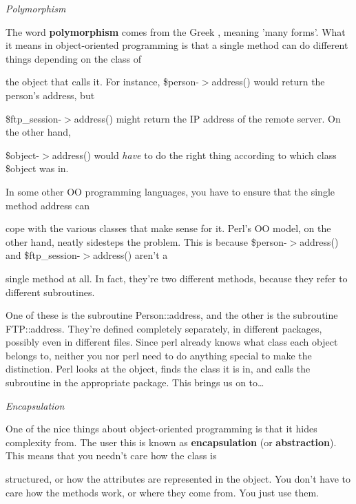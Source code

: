 \documentclass[a4paper,11pt]{book}
\begin{document}
\noindent 

\noindent \textit{Polymorphism}

\noindent The word \textbf{polymorphism }comes from the Greek  , meaning 'many forms'. What it means in object-oriented programming is that a single method can do different things depending on the class of

\noindent the object that calls it. For instance, \$person-$>$address() would return the person's address, but

\noindent \$ftp\_session-$>$address() might return the IP address of the remote server. On the other hand,

\noindent \$object-$>$address() would \textit{have }to do the right thing according to which class \$object was in.

\noindent 

\noindent In some other OO programming languages, you have to ensure that the single method address can

\noindent cope with the various classes that make sense for it. Perl's OO model, on the other hand, neatly sidesteps the problem. This is because \$person-$>$address() and \$ftp\_session-$>$address() aren't a

\noindent single method at all. In fact, they're two different methods, because they refer to different subroutines.

\noindent 

\noindent One of these is the subroutine Person::address, and the other is the subroutine FTP::address. They're defined completely separately, in different packages, possibly even in different files. Since perl already knows what class each object belongs to, neither you nor perl need to do anything special to make the distinction. Perl looks at the object, finds the class it is in, and calls the subroutine in the appropriate package. This brings us on to\dots 

\noindent 

\noindent 

\noindent \textit{Encapsulation}

\noindent One of the nice things about object-oriented programming is that it hides complexity from. The user this is known as \textbf{encapsulation }(or \textbf{abstraction}). This means that you needn't care how the class is

\noindent structured, or how the attributes are represented in the object. You don't have to care how the methods work, or where they come from. You just use them.
\end{document}
